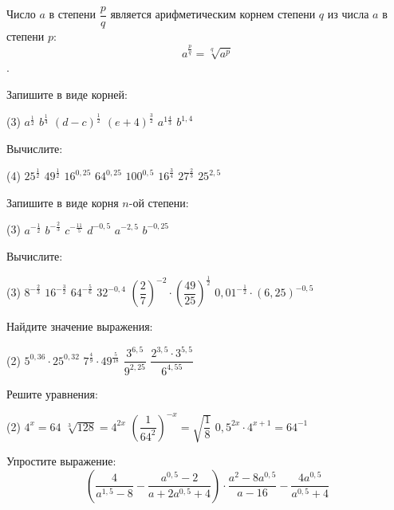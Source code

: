 \begin{class}[number=3]
	\begin{definit}
		Число \(a\) в степени \(\dfrac{p}{q}\) является арифметическим корнем степени \(q\) из числа \(a\) в степени \(p\): \[ a^{\frac{p}{q}}=\sqrt[q]{a^p} \].
	\end{definit}
	\begin{listofex}
		\item Запишите в виде корней:
		\begin{tasks}(3)
			\task \( a^{\tfrac{1}{2}} \)
			\task \( b^{\tfrac{1}{4}} \)
			\task \( (d-c)^{\tfrac{1}{2}} \)
			\task \( (e+4)^{\tfrac{3}{2}} \)
			\task \( a^{1\tfrac{4}{3}} \)
			\task \( b^{1,4} \)
		\end{tasks}
		\item Вычислите:
		\begin{tasks}(4)
			\task \( 25^{\tfrac{1}{2}} \)
			\task \( 49^{\tfrac{1}{2}} \)
			\task \( 16^{0,25} \)
			\task \( 64^{0,25} \)
			\task \( 100^{0,5} \)
			\task \( 16^{\tfrac{3}{4}} \)
			\task \( 27^{\tfrac{2}{3}} \)
			\task \( 25^{2,5} \)
		\end{tasks}
		\item Запишите в виде корня \(n\)-ой степени:
		\begin{tasks}(3)
			\task \( a^{-\tfrac{1}{2}} \)
			\task \( b^{-\tfrac{2}{3}} \)
			\task \( c^{-\tfrac{11}{5}} \)
			\task \( d^{-0,5} \)
			\task \( a^{-2,5} \)
			\task \( b^{-0,25} \)
		\end{tasks}
		\item Вычислите:
		\begin{tasks}(3)
			\task \( 8^{-\tfrac{2}{3}} \)
			\task \( 16^{-\tfrac{3}{2}} \)
			\task \( 64^{-\tfrac{5}{6}} \)
			\task \( 32^{-0,4} \)
			\task \( \left( \dfrac{2}{7}\right)^{-2} \cdot \left( \dfrac{49}{25} \right)^{\tfrac{1}{2}} \)
			\task \( 0,01^{-\tfrac{1}{2}} \cdot (6,25)^{-0,5} \)
		\end{tasks}
		\item Найдите значение выражения:
		\begin{tasks}(2)
			\task \( 5^{0,36} \cdot 25^{0,32} \)
			\task \( 7^{\tfrac{4}{9}} \cdot 49^{\tfrac{5}{18}} \)
			\task \( \dfrac{3^{6,5}}{9^{2,25}} \)
			\task \( \dfrac{2^{3,5}\cdot3^{5,5}}{6^{4,55}} \)
		\end{tasks}
		\item Решите уравнения:
		\begin{tasks}(2)
			\task \( 4^x=64 \)
			\task \( \sqrt[3]{128}=4^{2x} \)
			\task \( \left( \dfrac{1}{64^2} \right)^{-x}=\sqrt{\dfrac{1}{8}} \)
			\task \( 0,5^{2x}\cdot 4^{x+1}=64^{-1} \)
		\end{tasks}
		\item Упростите выражение: \[   \left( \dfrac{4}{a^{1,5}-8} - \dfrac{a^{0,5}-2}{a+2a^{0,5}+4} \right) \cdot \dfrac{a^2-8a^{0,5}}{a-16} - \dfrac{4a^{0,5}}{a^{0,5}+4} \]
			


\end{listofex}
\end{class}
